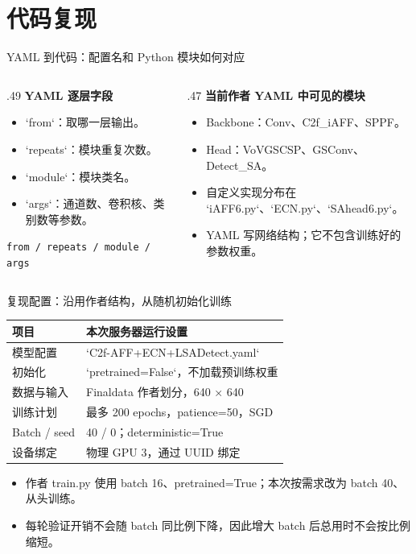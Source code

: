 \documentclass[aspectratio=169,10pt]{ctexbeamer}
\begin{document}
\section{代码复现}
\begin{frame}{YAML 到代码：配置名和 Python 模块如何对应}
\begin{columns}[T,onlytextwidth]
\begin{column}{.49\textwidth}
\textbf{YAML 逐层字段}
\begin{itemize}
\item `from`：取哪一层输出。
\item `repeats`：模块重复次数。
\item `module`：模块类名。
\item `args`：通道数、卷积核、类别数等参数。
\end{itemize}
\texttt{from / repeats / module / args}
\end{column}
\begin{column}{.47\textwidth}
\textbf{当前作者 YAML 中可见的模块}
\begin{itemize}
\item Backbone：Conv、C2f\_iAFF、SPPF。
\item Head：VoVGSCSP、GSConv、Detect\_SA。
\item 自定义实现分布在 `iAFF6.py`、`ECN.py`、`SAhead6.py`。
\item YAML 写网络结构；它不包含训练好的参数权重。
\end{itemize}
\end{column}
\end{columns}
\end{frame}

\begin{frame}{复现配置：沿用作者结构，从随机初始化训练}
\centering
\vspace{3pt}
\renewcommand{\arraystretch}{1.18}
\begin{tabular}{ll}
\toprule
项目 & 本次服务器运行设置\\ \midrule
模型配置 & `C2f-AFF+ECN+LSADetect.yaml`\\
初始化 & `pretrained=False`，不加载预训练权重\\
数据与输入 & Finaldata 作者划分，640 × 640\\
训练计划 & 最多 200 epochs，patience=50，SGD\\
Batch / seed & 40 / 0；deterministic=True\\
设备绑定 & 物理 GPU 3，通过 UUID 绑定\\
\bottomrule
\end{tabular}
\vspace{.22cm}
\begin{itemize}
\item 作者 train.py 使用 batch 16、pretrained=True；本次按需求改为 batch 40、从头训练。
\item 每轮验证开销不会随 batch 同比例下降，因此增大 batch 后总用时不会按比例缩短。
\end{itemize}
\end{frame}
\end{document}
